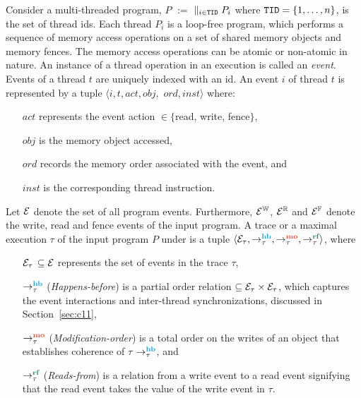 Consider a multi-threaded \cc program, 
$P$ $:=$ $\parallel_{i\in \text{\tt TID}} P_i$
where $\text{\tt TID}= \{1,\ldots,n\}$, is the 
set of thread ids. 
Each thread $P_i$ is a loop-free program, which
performs a sequence of memory access operations 
on a set of shared memory objects and \cc memory 
fences.  The memory access operations can be 
atomic or non-atomic in nature.
%
An instance of a thread operation in an execution 
is called an {\em event}.  Events of a thread $t$ 
are uniquely indexed with an id.
%
{ \label{def:event}}\newline
An event $i$ of thread $t$ is represented by a tuple 
$\langle i, t, act, obj,$ $ ord, inst \rangle$ where:
\begin{itemize}[label=inst,align=left,leftmargin=*]
\item [$act$] represents the event action $\in 
	\{$read, write, fence$\}$,
\item [$obj$] is the memory object accessed,
\item [$ord$] records the \cc memory order associated 
	with the event, and
\item [$inst$] is the corresponding thread instruction.
\end{itemize}
%
Let $\mathcal{E}$ denote the set of all program events. 
Furthermore, $\mathcal{E}^{\mathbb{W}}$, $\mathcal{E}^{\mathbb{R}}$ and $\mathcal{E}^{\mathbb{F}}$ denote 
the write, read and fence events of the input program.
%
{ \label{def:trace}}\newline
A trace or a maximal execution $\tau$ of the input 
program $P$ under \cc is a tuple 
$\langle \events_\tau, \setHB, \setMO, \setRF \rangle$, 
where
\begin{itemize}[label=sethb,align=left,leftmargin=*]
	\item [$\mathcal{E}_\tau$] $\subseteq \mathcal{E}$ 
		represents the set of events in the trace 
		$\tau$,
	\item [$\setHB$] ({\em Happens-before}) is a partial 
		order relation $\subseteq \mathcal{E}_\tau \times 
		\mathcal{E}_\tau$, which captures the event 
		interactions and inter-thread synchronizations, 
		discussed in Section~\ref{sec:c11},
	\item [$\setMO$] ({\em Modification-order}) is a 
		total order on the writes of an object that 
		establishes coherence of $\tau$ \wrt $\setHB$, 
		and
	\item [$\setRF$] ({\em Reads-from}) is a relation 
		from a write event to a read event signifying 
		that the read event takes the value of the write 
		event in $\tau$.
\end{itemize}

